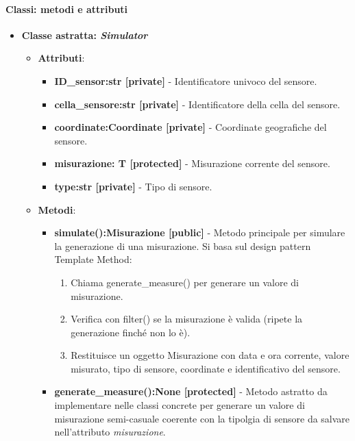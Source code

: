 \paragraph{Classi: metodi e attributi}
\begin{itemize}
    \item {\textbf{Classe astratta: \textit{Simulator}}}
        \begin{itemize}
            \item \textbf{Attributi}: 
            \begin{itemize}
                \item \textbf{ID\_sensor:str [private]} - Identificatore univoco del sensore.
                \item \textbf{cella\_sensore:str [private]} - Identificatore della cella del sensore.
                \item \textbf{coordinate:Coordinate [private]} - Coordinate geografiche del sensore.
                \item \textbf{misurazione: T [protected]} - Misurazione corrente del sensore.
                \item \textbf{type:str [private]} - Tipo di sensore.
            \end{itemize}
            \item \textbf{Metodi}:
            \begin{itemize}
                \item \textbf{simulate():Misurazione [public]} - Metodo principale per simulare la generazione di una misurazione.
                Si basa sul design pattern Template Method:
                \begin{enumerate}
                    \item     Chiama generate\_measure() per generare un valore di misurazione.
                    \item     Verifica con filter() se la misurazione è valida (ripete la generazione finché non lo è).
                    \item     Restituisce un oggetto Misurazione con data e ora corrente, valore misurato, tipo di sensore, coordinate e identificativo del sensore.
                \end{enumerate}
                \item \textbf{generate\_measure():None [protected]} - Metodo astratto da implementare nelle classi concrete per generare un valore di misurazione semi-casuale coerente con la tipolgia di sensore da salvare nell'attributo \textit{misurazione}.

\end{itemize}
\end{itemize}
\end{itemize}
